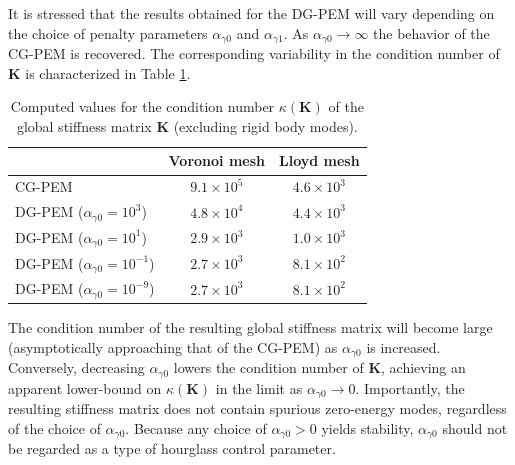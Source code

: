 It is stressed that the results obtained for the DG-PEM will vary depending on the choice of penalty parameters $\alpha_{\gamma0}$ and $\alpha_{\gamma1}$. As $\alpha_{\gamma0} \rightarrow \infty$ the behavior of the CG-PEM is recovered. The corresponding variability in the condition number of $\bm{K}$ is characterized in Table \ref{tab:global_stiffness_condition_number}.
\begin{table}[!ht]
  \begin{center}
    \begin{tabular}{| l || c | c |}
    \hline
           & Voronoi mesh & Lloyd mesh \\ \hline \hline
    CG-PEM & $9.1 \times 10^{5}$ & $4.6 \times 10^{3}$ \\ \hline
    DG-PEM ($\alpha_{\gamma0} = 10^3$) & $4.8 \times 10^{4}$ & $4.4 \times 10^{3}$ \\ \hline
    DG-PEM ($\alpha_{\gamma0} = 10^1$) & $2.9 \times 10^{3}$ & $1.0 \times 10^{3}$ \\ \hline
    DG-PEM ($\alpha_{\gamma0} = 10^{-1}$) & $2.7 \times 10^{3}$ & $8.1 \times 10^{2}$  \\ \hline
    DG-PEM ($\alpha_{\gamma0} = 10^{-9}$) & $2.7 \times 10^{3}$ & $8.1 \times 10^{2}$ \\
    \hline
    \end{tabular}
    \caption{Computed values for the condition number $\kappa(\bm{K})$ of the global stiffness matrix $\bm{K}$ (excluding rigid body modes).}
    \vspace{-5pt}
    \label{tab:global_stiffness_condition_number}
    \vspace{-10pt}
  \end{center}
\end{table}

The condition number of the resulting global stiffness matrix will become large (asymptotically approaching that of the CG-PEM) as $\alpha_{\gamma0}$ is increased. Conversely, decreasing $\alpha_{\gamma0}$ lowers the condition number of $\bm{K}$, achieving an apparent lower-bound on $\kappa (\bm{K})$ in the limit as $\alpha_{\gamma0} \rightarrow 0$. Importantly, the resulting stiffness matrix does not contain spurious zero-energy modes, regardless of the choice of $\alpha_{\gamma0}$. Because any choice of $\alpha_{\gamma0} > 0$ yields stability, $\alpha_{\gamma0}$ should not be regarded as a type of hourglass control parameter.



